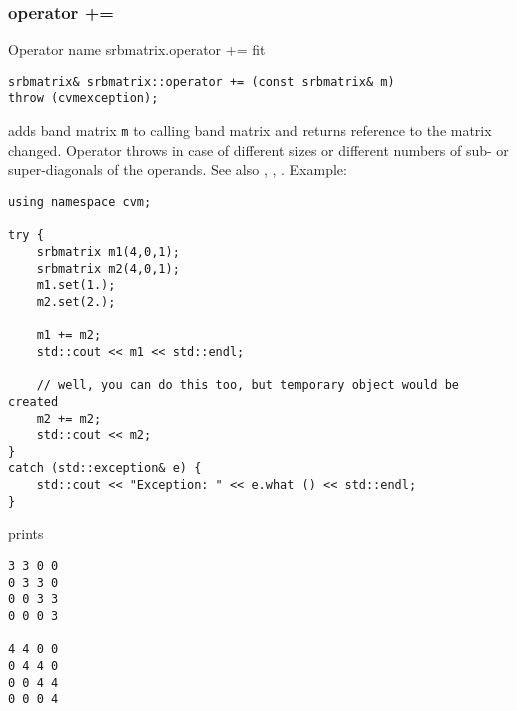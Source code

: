\subsubsection{operator +=}
Operator%
\pdfdest name {srbmatrix.operator +=} fit
\begin{verbatim}
srbmatrix& srbmatrix::operator += (const srbmatrix& m) 
throw (cvmexception);
\end{verbatim}
adds  band matrix \verb"m" to  calling band matrix 
and returns  reference to
the matrix changed.
Operator throws  
in case of different sizes or different numbers of sub- or super-diagonals
of the operands.
See also ,
,
.
Example:
\begin{Verbatim}
using namespace cvm;

try {
    srbmatrix m1(4,0,1);
    srbmatrix m2(4,0,1);
    m1.set(1.);
    m2.set(2.);

    m1 += m2;
    std::cout << m1 << std::endl;

    // well, you can do this too, but temporary object would be created
    m2 += m2; 
    std::cout << m2;
}
catch (std::exception& e) {
    std::cout << "Exception: " << e.what () << std::endl;
}
\end{Verbatim}
prints
\begin{Verbatim}
3 3 0 0
0 3 3 0
0 0 3 3
0 0 0 3

4 4 0 0
0 4 4 0
0 0 4 4
0 0 0 4
\end{Verbatim}
\newpage




